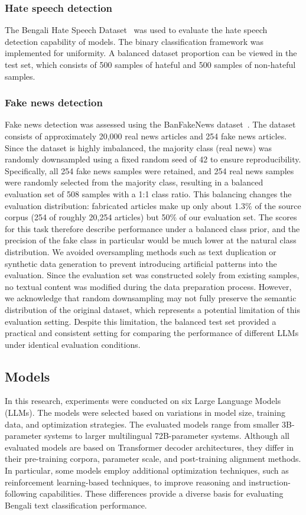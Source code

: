 \documentclass[10pt,letterpaper]{article}
\begin{document}
\subsubsection*{Hate speech detection}
The Bengali Hate Speech Dataset~\cite{b33} was used to evaluate the hate speech detection capability of models. The binary classification framework was implemented for uniformity. A balanced dataset proportion can be viewed in the test set, which consists of 500 samples of hateful and 500 samples of non-hateful samples.

\subsubsection*{Fake news detection}
Fake news detection was assessed using the BanFakeNews dataset~\cite{b34}. The dataset consists of approximately 20,000 real news articles and 254 fake news articles. Since the dataset is highly imbalanced, the majority class (real news) was randomly downsampled using a fixed random seed of 42 to ensure reproducibility. Specifically, all 254 fake news samples were retained, and 254 real news samples were randomly selected from the majority class, resulting in a balanced evaluation set of 508 samples with a 1:1 class ratio. This balancing changes the evaluation distribution: fabricated articles make up only about 1.3\% of the source corpus (254 of roughly 20,254 articles) but 50\% of our evaluation set. The scores for this task therefore describe performance under a balanced class prior, and the precision of the fake class in particular would be much lower at the natural class distribution. We avoided oversampling methods such as text duplication or synthetic data generation to prevent introducing artificial patterns into the evaluation. Since the evaluation set was constructed solely from existing samples, no textual content was modified during the data preparation process. However, we acknowledge that random downsampling may not fully preserve the semantic distribution of the original dataset, which represents a potential limitation of this evaluation setting. Despite this limitation, the balanced test set provided a practical and consistent setting for comparing the performance of different LLMs under identical evaluation conditions.



\subsection*{Models}
In this research, experiments were conducted on six Large Language Models (LLMs). 
The models were selected based on variations in model size, training data, and 
optimization strategies. The evaluated models range from smaller 3B-parameter 
systems to larger multilingual 72B-parameter systems. Although all evaluated 
models are based on Transformer decoder architectures, they differ in their 
pre-training corpora, parameter scale, and post-training alignment methods. 
In particular, some models employ additional optimization techniques, such as 
reinforcement learning-based techniques, to improve reasoning and 
instruction-following capabilities. These differences provide a diverse basis 
for evaluating Bengali text classification performance.
\end{document}
